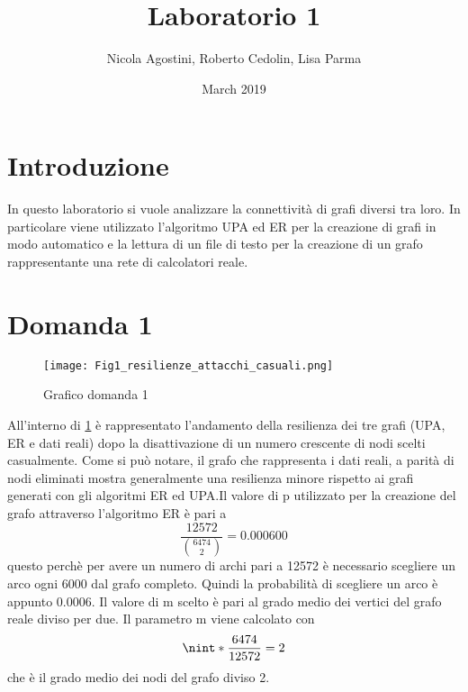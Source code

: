\documentclass{article}
\title{Laboratorio 1}
\author{Nicola Agostini, Roberto Cedolin, Lisa Parma}
\date{March 2019}
\DeclarePairedDelimiter{\nint}\lfloor\rceil
\begin{document}
\maketitle

\section*{Introduzione}

In questo laboratorio si vuole analizzare la connettività di grafi diversi tra loro. In particolare viene utilizzato l'algoritmo UPA ed ER per la creazione di grafi in modo automatico e la lettura di un file di testo per la creazione di un grafo rappresentante una rete di calcolatori reale.


\section*{Domanda 1}
\begin{center}
\begin{figure}[h]
\texttt{[image: Fig1\_resilienze\_attacchi\_casuali.png]}
\caption{Grafico domanda 1}
\label{fig:graph1}
\end{figure}
\end{center}

All'interno di \ref{fig:graph1} è rappresentato l'andamento della resilienza dei tre grafi (UPA, ER e dati reali) dopo la disattivazione di un numero crescente di nodi scelti casualmente. Come si può notare, il grafo che rappresenta i dati reali, a parità di nodi eliminati mostra generalmente una resilienza minore rispetto ai grafi generati con gli algoritmi ER ed UPA.\newline Il valore di p utilizzato per la creazione del grafo attraverso l'algoritmo ER è pari a 
\[
    \frac{12572}{\binom{6474}{2}}=0.000600
\]
questo perchè per avere un numero di archi pari a 12572 è necessario scegliere un arco ogni 6000 dal grafo completo. Quindi la probabilità di scegliere un arco è appunto 0.0006.
Il valore di m scelto è pari al grado medio dei vertici del grafo reale diviso per due. Il parametro m viene calcolato con 
\[
  \nint*{\frac{6474}{12572}}=2
\]
che è il grado medio dei nodi del grafo diviso 2.

\FloatBarrier
\end{document}
